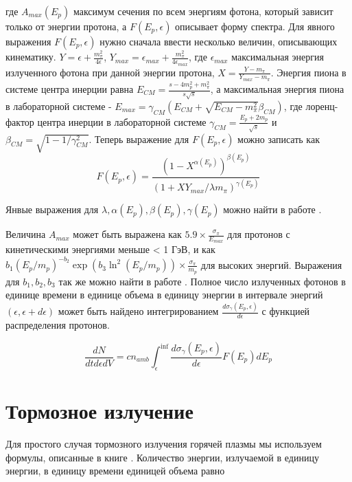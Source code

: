 где $A_{max}(E_p)$ максимум сечения по всем энергиям фотона, который зависит только от энергии протона, а $F\left(E_p,\epsilon\right)$ описывает форму спектра. Для явного выражения $F\left(E_p, \epsilon\right)$ нужно сначала ввести несколько величин, описывающих кинематику. $Y=\epsilon+\frac{m_{\pi}^2}{4 \epsilon}$, $Y_{max}=\epsilon_{max}+\frac{m_{\pi}^2}{4 \epsilon_{max}}$, где $\epsilon_{max}$ максимальная энергия излученного фотона при данной энергии протона, $X=\frac{Y-m_{\pi}}{Y_{max}-m_{\pi}}$. Энергия пиона в системе центра инерции равна $E_{CM}=\frac{s-4m_p^2+m_{\pi}^2}{s\sqrt{s}}$, а максимальная энергия пиона в лабораторной системе -  $E_{max}=\gamma_{CM}\left(E_{CM}+\sqrt{E_{CM}-m_{\pi}^2}\beta_{CM}\right)$, где лоренц-фактор центра инерции в лабораторной системе $\gamma_{CM}=\frac{E_p+2m_p}{\sqrt{s}}$ и $\beta_{CM}=\sqrt{1-1/\gamma_{CM}^2}$. Теперь выражение для $F\left(E_p,\epsilon\right)$ можно записать как
\begin{equation}
	F\left(E_p,\epsilon\right) = \frac{\left(1-X^{\alpha(E_p)}\right)^{\beta(E_p)}}{\left(1+X Y_{max}/\lambda m_{\pi}\right)^{\gamma(E_p)}}
\end{equation}

Янвые выражения для $\lambda, \alpha(E_p), \beta(E_p), \gamma(E_p)$ можно найти в работе \cite{Kafexhiu}.

Величина $A_{max}$ может быть выражена как $5.9\times\frac{\sigma_{\pi}}{E_{max}}$ для протонов с кинетическими энергиями меньше < 1 ГэВ, и как $b_1 \left(E_p/m_p\right)^{-b_2}\exp\left(b_3 \ln^2\left(E_p/m_p\right)\right)\times\frac{\sigma_{\pi}}{m_p}$ для высоких энергий. Выражения для $b_1, b_2, b_3$ так же можно найти в работе \cite{Kafexhiu}. Полное число излученных фотонов в единице времени в единице объема в единицу энергии в интервале энергий $\left(\epsilon, \epsilon + d\epsilon\right)$ может быть найдено интегрированием $\frac{d\sigma_{\gamma}\left(E_p, \epsilon\right)}{d\epsilon}$ с функцией распределения протонов.

\begin{equation}
	\frac{dN}{dt d\epsilon dV} = c n_{amb} \int_{\epsilon}^{\inf}\frac{d\sigma_{\gamma}\left(E_p, \epsilon\right)}{d\epsilon} F(E_p) dE_p
\end{equation} 

\section{Тормозное излучение}\label{BremsstrahlungFormulae}

Для простого случая тормозного излучения горячей плазмы мы используем формулы, описанные в книге \cite{Rybicki}.
Количество энергии, излучаемой в единицу энергии, в единицу времени единицей объема равно

